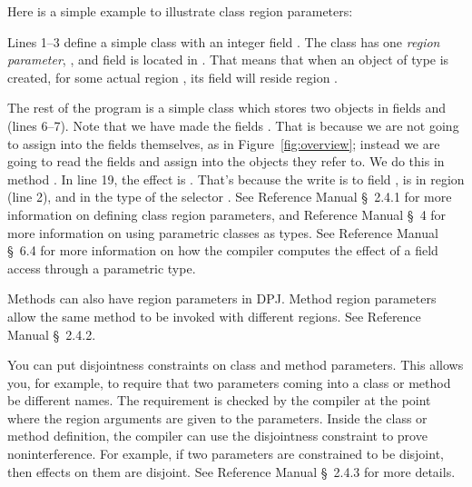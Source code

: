 Here is a simple example to illustrate class region parameters:
%

%
Lines 1--3 define a simple  class with an integer field
.  The class has one \emph{region parameter}, , and
field  is located in .  That means that when an object
of type  is created, for some actual region , its
 field will reside region .

The rest of the program is a simple class  which stores
two  objects in fields  and  (lines
6--7).  Note that we have made the fields .  That is
because we are not going to assign into the fields themselves, as in
Figure~\ref{fig:overview}; instead we are going to read the fields and
assign into the objects they refer to.  We do this in method
.  In line 19, the effect is .
That's because the write is to field ,  is in region
 (line 2), and  in the type of the selector
.  See Reference Manual \S~2.4.1 for more information on
defining class region parameters, and Reference Manual \S~4 for more
information on using parametric classes as types.  See Reference
Manual \S~6.4 for more information on how the compiler computes the
effect of a field access through a parametric type.

 Methods can also have region
parameters in DPJ.  Method region parameters allow the same method to
be invoked with different regions.  See Reference Manual \S~2.4.2.

 You can put
disjointness constraints on class and method parameters.  This allows
you, for example, to require that two parameters coming into a class
or method be different names.  The requirement is checked by the
compiler at the point where the region arguments are given to the
parameters.  Inside the class or method definition, the compiler can
use the disjointness constraint to prove noninterference.  For
example, if two parameters are constrained to be disjoint, then
effects on them are disjoint.  See Reference Manual \S~2.4.3 for
more details.

